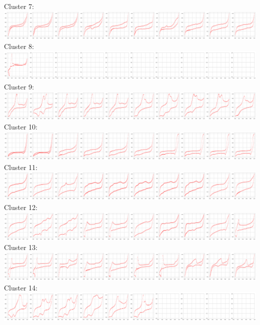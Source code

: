 Cluster 7:\\
\includegraphics[width=1.0\textwidth]{figures/clusters/cv_cluster7.png}
Cluster 8:\\
\includegraphics[width=1.0\textwidth]{figures/clusters/cv_cluster8.png}
Cluster 9:\\
\includegraphics[width=1.0\textwidth]{figures/clusters/cv_cluster9.png}
Cluster 10:\\
\includegraphics[width=1.0\textwidth]{figures/clusters/cv_cluster10.png}
Cluster 11:\\
\includegraphics[width=1.0\textwidth]{figures/clusters/cv_cluster11.png}
Cluster 12:\\
\includegraphics[width=1.0\textwidth]{figures/clusters/cv_cluster12.png}
Cluster 13:\\
\includegraphics[width=1.0\textwidth]{figures/clusters/cv_cluster13.png}
Cluster 14:\\
\includegraphics[width=1.0\textwidth]{figures/clusters/cv_cluster14.png}

